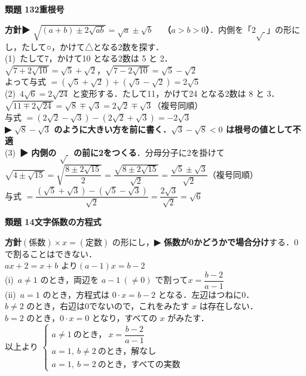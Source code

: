 \documentclass[a4paper,11pt]{ltjsarticle}
\newcommand{\ans}[2]{\Needspace{5\baselineskip}\vspace{6pt}%
  {\sffamily\bfseries 類題 #1\quad #2}\par}
\newcommand{\point}[1]{\textsf{\bfseries ▶ #1}}
\begin{document}
\ans{13}{2重根号}
\begin{kai}
\textbf{方針}\quad \point{$\sqrt{(a+b)\pm2\sqrt{ab}}=\sqrt a\pm\sqrt b$\ \ （$a>b>0$）}．内側を「$2\sqrt{\ }$」の形にし，たして○，かけて△となる2数を探す．\\[2pt]
(1)\ たして7，かけて10 となる2数は 5 と 2．\\
\hspace*{1.5em}$\sqrt{7+2\sqrt{10}}=\sqrt5+\sqrt2$，\quad $\sqrt{7-2\sqrt{10}}=\sqrt5-\sqrt2$\\
\hspace*{1.5em}よって\quad 与式 $=(\sqrt5+\sqrt2)+(\sqrt5-\sqrt2)=2\sqrt5$\\[2pt]
(2)\ $4\sqrt6=2\sqrt{24}$ と変形する．たして11，かけて24 となる2数は 8 と 3．\\
\hspace*{1.5em}$\sqrt{11\mp2\sqrt{24}}=\sqrt8\mp\sqrt3=2\sqrt2\mp\sqrt3$（複号同順）\\
\hspace*{1.5em}与式 $=(2\sqrt2-\sqrt3)-(2\sqrt2+\sqrt3)=-2\sqrt3$\\
\hspace*{1.5em}\point{$\sqrt8-\sqrt3$ のように大きい方を前に書く．$\sqrt3-\sqrt8<0$ は根号の値として不適}\\[2pt]
(3)\ \point{内側の $\sqrt{\ }$ の前に2をつくる}．分母分子に2を掛けて\\
\hspace*{1.5em}$\sqrt{4\pm\sqrt{15}}=\sqrt{\dfrac{8\pm2\sqrt{15}}{2}}=\dfrac{\sqrt{8\pm2\sqrt{15}}}{\sqrt2}=\dfrac{\sqrt5\pm\sqrt3}{\sqrt2}$（複号同順）\\[2pt]
\hspace*{1.5em}与式 $=\dfrac{(\sqrt5+\sqrt3)-(\sqrt5-\sqrt3)}{\sqrt2}=\dfrac{2\sqrt3}{\sqrt2}=\sqrt6$
\end{kai}

\ans{14}{文字係数の方程式}
\begin{kai}
\textbf{方針}\quad $(\text{係数})\times x=(\text{定数})$ の形にし，\point{係数が0かどうかで場合分け}する．0で割ることはできない．\\[2pt]
$ax+2=x+b$ より\quad $(a-1)x=b-2$\\[2pt]
(i)\ $a\neq1$ のとき，両辺を $a-1\ (\neq0)$ で割って\quad $x=\dfrac{b-2}{a-1}$\\[2pt]
(ii)\ $a=1$ のとき，方程式は $0\cdot x=b-2$ となる．左辺はつねに0．\\
\hspace*{1.5em}$b\neq2$ のとき，右辺は0でないので，これをみたす $x$ は存在しない．\\
\hspace*{1.5em}$b=2$ のとき，$0\cdot x=0$ となり，すべての $x$ がみたす．\\[2pt]
以上より\quad
$\begin{cases}a\neq1\ \text{のとき，}\ x=\dfrac{b-2}{a-1}\\ a=1,\ b\neq2\ \text{のとき，解なし}\\ a=1,\ b=2\ \text{のとき，すべての実数}\end{cases}$
\end{kai}
\end{document}
